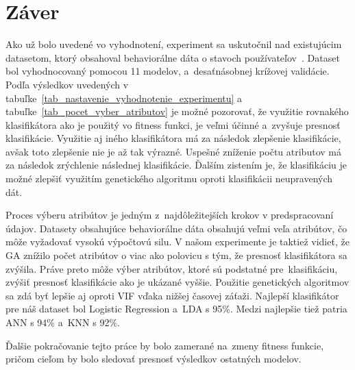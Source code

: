 \documentclass[runningheads]{llncs}
\begin{document}
\section{Záver}


Ako už bolo uvedené vo vyhodnotení, experiment sa uskutočnil nad existujúcim datasetom, 
ktorý obsahoval behaviorálne dáta o stavoch používateľov~\cite{ref_dataset_anguita,ref_dataset}.
Dataset bol vyhodnocovaný pomocou 11 modelov, a~desaťnásobnej krížovej validácie.
Podľa výsledkov uvedených v tabuľke~\ref{tab_nastavenie_vyhodnotenie_experimentu} 
a tabuľke~\ref{tab_pocet_vyber_atributov} je možné pozorovať, že využitie rovnakého klasifikátora
ako je použitý vo fitness funkci, je veľmi účinné a~zvyšuje presnosť klasifikácie. Využitie aj iného klasifikátora má za následok zlepšenie klasifikácie, avšak toto zlepšenie nie je až tak výrazné. Uspešné zníženie počtu atributov má za následok zrýchlenie následnej klasifikácie. Ďalším zistením je, že klasifikáciu je možné zlepšiť 
využitím genetického algoritmu oproti klasifikácii neupravených dát. 

Proces výberu atribútov je jedným z~najdôležitejších krokov v predspracovaní údajov. Datasety 
obsahujúce behaviorálne dáta obsahujú veľmi veľa atribútov, čo môže vyžadovať vysokú výpočtovú silu. V našom
experimente je taktiež vidieť, že GA znížilo počet atribútov o viac ako polovicu s tým, že presnosť klasifikátora sa zvýšila.
Práve preto môže výber atribútov, ktoré sú podstatné pre~klasifikáciu, zvýšiť presnosť klasifikácie
ako je ukázané vyššie. Použitie genetických algoritmov sa zdá byť lepšie aj oproti VIF vďaka nižšej časovej záťaži.
Najlepší klasifikátor pre náš dataset bol Logistic Regression a~LDA s 95\%. Medzi najlepšie tiež patria
ANN s 94\% a~KNN s 92\%.

Ďalšie pokračovanie tejto práce by bolo zamerané na~zmeny fitness funkcie, pričom cieľom by bolo sledovať presnosť výsledkov ostatných modelov.
\end{document}
